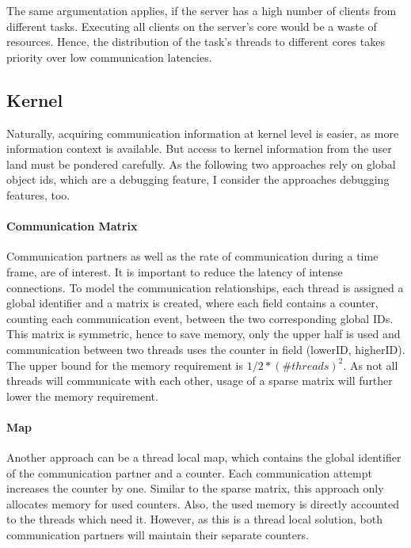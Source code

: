 The same argumentation applies, if the server has a high number of clients from
different tasks.
Executing all clients on the server's core would be a waste of resources.
Hence, the distribution of the task's threads to different cores takes priority
over low communication latencies.


\subsection{Kernel}
Naturally, acquiring communication information at kernel level is easier, as
more information context is available.
But access to kernel information from the user land must be pondered carefully.
As the following two approaches rely on global object ids, which are a debugging
feature, I consider the approaches debugging features, too.


\paragraph{Communication Matrix}
Communication partners as well as the rate of communication during a time
frame, are of interest.
It is important to reduce the latency of intense connections.
To model the communication relationships, each thread is assigned a global
identifier and a matrix is created, where each field contains a counter,
counting each communication event, between the two corresponding global IDs.
This matrix is symmetric, hence to save memory, only the upper half is used
and communication between two threads uses the counter in field
(lowerID, higherID).
The upper bound for the memory requirement is $1/2 * (\#threads)^2$.
As not all threads will communicate with each other, usage of a sparse matrix
will further lower the memory requirement.

\paragraph{Map}
Another approach can be a thread local map, which contains the global
identifier of the communication partner and a counter.
Each communication attempt increases the counter by one.
Similar to the sparse matrix, this approach only allocates memory for used
counters.
Also, the used memory is directly accounted to the threads which need it.
However, as this is a thread local solution, both communication partners will
maintain their separate counters.
\\

